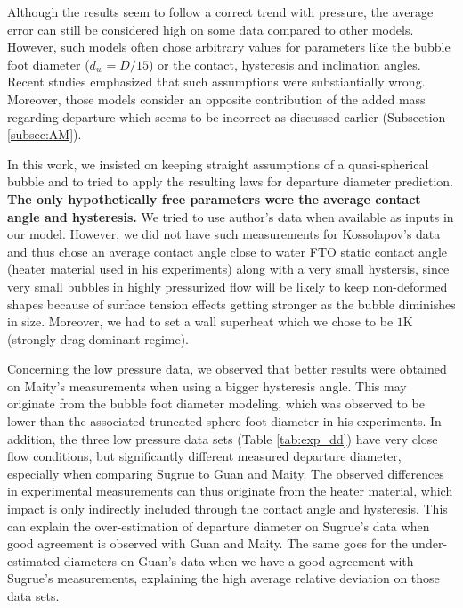 Although the results seem to follow a correct trend with pressure, the average error can still be considered high on some data compared to other models\cite{Klausner1993}. However, such models often chose arbitrary values for parameters like the bubble foot diameter ($d_{w}=D/15$)\cite{Mazzocco2018} or the contact, hysteresis and inclination angles. Recent studies emphasized that such assumptions were substiantially wrong\cite{Bucci2021}. Moreover, those models consider an opposite contribution of the added mass regarding departure which seems to be incorrect as discussed earlier (Subsection \ref{subsec:AM}).

In this work, we insisted on keeping straight assumptions of a quasi-spherical bubble and to tried to apply the resulting laws for departure diameter prediction. \textbf{The only hypothetically free parameters were the average contact angle and hysteresis.} We tried to use author's data when available as inputs in our model. However, we did not have such measurements for Kossolapov's data and thus chose an average contact angle close to water FTO static contact angle (heater material used in his experiments) along with a very small hystersis, since very small bubbles in highly pressurized flow will be likely to keep non-deformed shapes because of surface tension effects getting stronger as the bubble diminishes in size. Moreover, we had to set a wall superheat which we chose to be $1$K (strongly drag-dominant regime).

Concerning the low pressure data, we observed that better results were obtained on Maity's measurements when using a bigger hysteresis angle. This may originate from the bubble foot diameter modeling, which was observed to be lower than the associated truncated sphere foot diameter in his experiments. In addition, the three low pressure data sets (Table \ref{tab:exp_dd}) have very close flow conditions, but significantly different measured departure diameter, especially when comparing Sugrue to Guan and Maity. The observed differences in experimental measurements can thus originate from the heater material, which impact is only indirectly included through the contact angle and hysteresis. This can explain the over-estimation of departure diameter on Sugrue's data when good agreement is observed with Guan and Maity. The same goes for the under-estimated diameters on Guan's data when we have a good agreement with Sugrue's measurements, explaining the high average relative deviation on those data sets.